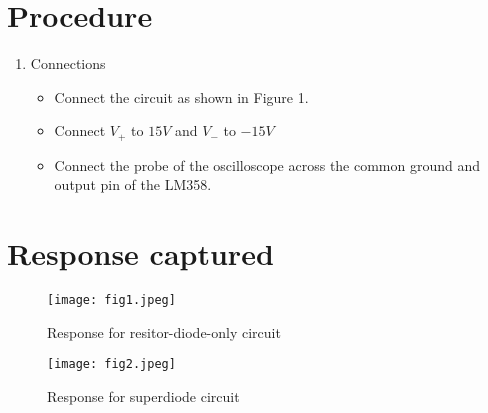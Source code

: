 \documentclass[a4paper,12pt]{article}
\begin{document}
\section{Procedure}
\begin{enumerate}
\item Connections
\begin{itemize}
\item Connect the circuit as shown in Figure 1.
\item Connect $V_+$ to $15 V$ and $V_-$ to $-15 V$ 
\item Connect the probe of the oscilloscope across the common ground and output pin of the LM358.
\end{itemize}
\end{enumerate}

\section{Response captured}
\begin{figure}[!htb]
  {\texttt{[image: fig1.jpeg]}}
  \caption{Response for resitor-diode-only circuit}
\end{figure}
\begin{figure}[!htb]
  {\texttt{[image: fig2.jpeg]}}
  \caption{Response for superdiode circuit}
\end{figure}
\end{document}
